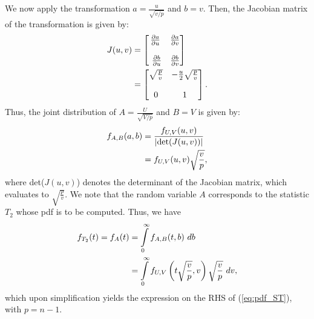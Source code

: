 \documentclass[a4paper,english,12pt]{article}
\begin{document}
We now apply the transformation $ a=\frac{u}{\sqrt{v/p}} $ and $ b=v $. Then, the Jacobian matrix of the transformation is given by:
\begin{align}
J(u,v)&=\left[
\begin{matrix}
\frac{\partial a}{\partial u}&\frac{\partial a}{\partial v}\\\\\
\frac{\partial b}{\partial u}&\frac{\partial b}{\partial v}
\end{matrix}\right]\nonumber\\
       &=\left[
       \begin{matrix}
       	\sqrt{\frac{p}{v}}&-\frac{u}{2}\sqrt{\frac{p}{v}}\\\vspace{0.2pt}\\
       	0&1
       \end{matrix}\right].\label{eq:J(u,v)}
\end{align}
Thus, the joint distribution of $ A=\frac{U}{\sqrt{V/p}} $ and $ B=V $ is given by:
\begin{align}
	f_{A,B}(a,b)&=\frac{f_{U,V}(u,v)}{|\text{det}(J(u,v))|}\nonumber\\
	            &=f_{U,V}(u,v)\sqrt{\frac{v}{p}},\label{eq:f_{A,B}(a,b)}
\end{align}
where det($ J(u,v) $) denotes the determinant of the Jacobian matrix, which evaluates to $ \sqrt{\frac{p}{v}} $. We note that the random variable $ A $ corresponds to the statistic $ T_{2} $ whose pdf is to be computed. Thus, we have
\begin{align}
	f_{T_{2}}(t)=f_{A}(t)&=\int\limits_{0}^{\infty} f_{A,B}(t,b) ~db\nonumber\\
				         &=\int\limits_{0}^{\infty} f_{U,V}\left(t\sqrt{\frac{v}{p}},v\right) \sqrt{\frac{v}{p}}~dv,\label{eq:f_{T_{2}}(t)}
\end{align} 
which upon simplification yields the expression on the RHS of (\ref*{eq:pdf_ST}), with $ p=n-1 $.\\
\end{document}
